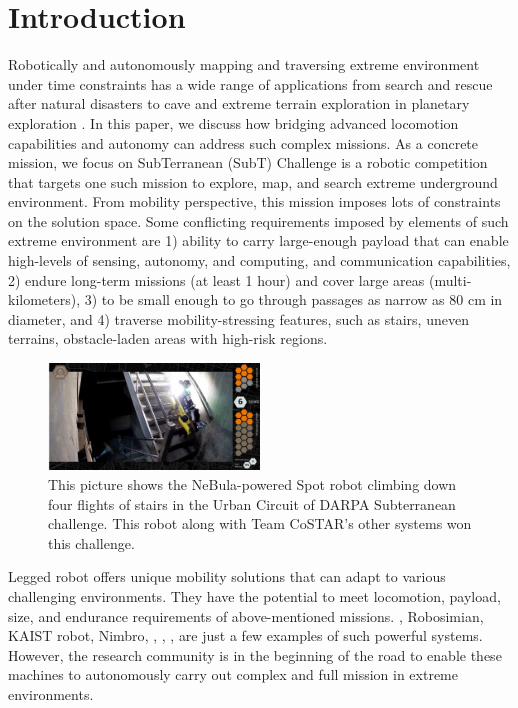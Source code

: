\documentclass[a4paper, 10pt, conference]{ieeeconf}      %
\newcommand{\ph}[1]{{\textbf{#1}:}} %
\begin{document}



\section{Introduction}\label{sec:intro}
Robotically and autonomously mapping and traversing extreme environment under time constraints has a wide range of applications from search and rescue after natural disasters \cite{} to cave and extreme terrain exploration in planetary exploration \cite{}. In this paper, we discuss how bridging advanced locomotion capabilities and autonomy can address such complex missions. As a concrete mission, we focus on SubTerranean (SubT) Challenge \cite{subt_webpage} is a robotic competition that targets one such mission to explore, map, and search extreme underground environment. From mobility perspective, this mission imposes lots of constraints on the solution space. Some conflicting requirements imposed by elements of such extreme environment are 1) ability to carry large-enough payload that can enable  high-levels of sensing, autonomy, and computing, and communication capabilities, 2) endure long-term missions (at least 1 hour) and cover large areas (multi-kilometers), 3) to be small enough to go through passages as narrow as 80 cm in diameter, and 4) traverse mobility-stressing features, such as stairs, uneven terrains, obstacle-laden areas with high-risk regions. 
\begin{figure}[t!]
  \centering
  \includegraphics[width=0.5\textwidth]{spot_iros/graphics/spot_cover_ver1.jpg}
  \caption{This picture shows the NeBula-powered Spot robot climbing down four flights of stairs in the Urban Circuit of DARPA Subterranean challenge. This robot along with Team CoSTAR's other systems won this challenge.}
  \label{figurelabel}
\end{figure}

Legged robot offers unique mobility solutions that can adapt to various challenging environments. They have the potential to meet locomotion, payload, size, and endurance requirements of above-mentioned missions. \cite{whyrobotdeepmines}, Robosimian\cite{Karumanchi2017}, KAIST robot\cite{jung2018development}, Nimbro\cite{schwarz2017nimbro}, \cite{mit_cheetah}, \cite{bigdog}, \cite{Bellicoso2018}, \cite{miller2019tunnel} are just a few examples of such powerful systems. However, the research community is in the beginning of the road to enable these machines to autonomously carry out complex and full mission in extreme environments.
\end{document}
